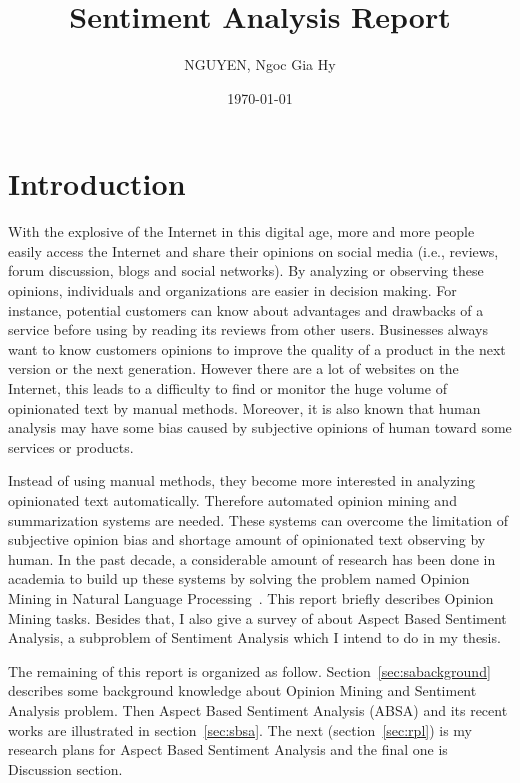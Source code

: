 \documentclass{article}
\title{Sentiment Analysis Report}
\author{NGUYEN, Ngoc Gia Hy }
\date{\today}
\begin{document}
\maketitle

\section{Introduction}

With the explosive of the Internet in this digital age, more and more people easily access the Internet and share their opinions on social media (i.e., reviews, forum discussion, blogs and social networks). 
By analyzing or observing these opinions, individuals and organizations are easier in decision making. 
For instance, potential customers can know about advantages and drawbacks of a service before using by reading its reviews from other users.
Businesses always want to know customers opinions to improve the quality of a product in the next version or the next generation. 
However there are a lot of websites on the Internet, this leads to a difficulty to find or monitor the huge volume of opinionated text by manual methods.
Moreover, it is also known that human analysis may have some bias caused by subjective opinions of human toward some services or products.

Instead of using manual methods, they become more interested in analyzing opinionated text automatically.
Therefore automated opinion mining and summarization systems are needed.
These systems can overcome the limitation of subjective opinion bias and shortage amount of opinionated text observing by human.
In the past decade, a considerable amount of research has been done in academia to build up these systems by solving the problem named Opinion Mining in Natural Language Processing~\cite{Liu10sentimentanalysis,Pang:2008:OMS:1454711.1454712}.
This report briefly describes Opinion Mining tasks.
Besides that, I also give a survey of about Aspect Based Sentiment Analysis, a subproblem of Sentiment Analysis which I intend to do in my thesis.

The remaining of this report is organized as follow.
Section~\ref{sec:sabackground} describes some background knowledge about Opinion Mining and Sentiment Analysis problem. 
Then Aspect Based Sentiment Analysis (ABSA) and its recent works are illustrated in section~\ref{sec:sbsa}. 
The next (section~\ref{sec:rpl})  is my research plans for Aspect Based Sentiment Analysis and the final one is Discussion section.
\end{document}

